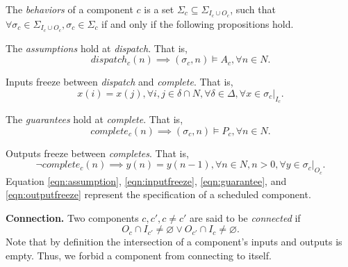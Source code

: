 

The \emph{behaviors} of a component $c$ is a set $\Sigma_c \subseteq \Sigma_{I_c \cup O_c}$, such that $\forall \sigma_c \in \Sigma_{I_c \cup O_c}, \sigma_c \in \Sigma_c $ if and only if the following propositions hold.

The \emph{assumptions} hold at \emph{dispatch}. That is,
\begin{equation} 
\label{eqn:assumption}
	dispatch_c(n) \implies (\sigma_c, n) \models A_c, \forall n\in N.
\end{equation}

Inputs freeze between \emph{dispatch} and \emph{complete}. That is,
\begin{equation} 
\label{eqn:inputfreeze}
	x(i) = x(j), \forall i,j\in \delta \cap N, \forall \delta \in \Delta, \forall x \in \sigma_c|_{I_c}.
\end{equation}

The \emph{guarantees} hold at \emph{complete}. That is,
\begin{equation} 
\label{eqn:guarantee}
	complete_c(n) \implies (\sigma_c, n) \models P_c, \forall n\in N.
\end{equation}

Outputs freeze between \emph{completes}. That is,
\begin{equation} 
\label{eqn:outputfreeze}
	\lnot complete_c(n) \implies y(n) = y(n-1), \forall n \in N, n > 0, \forall y \in \sigma_c|_{O_c}.
\end{equation}
Equation \ref{eqn:assumption}, \ref{eqn:inputfreeze}, \ref{eqn:guarantee}, and \ref{eqn:outputfreeze} represent the specification of a scheduled component.

{\bf Connection.}
Two components $ c, c', c\neq c'$ are said to be \emph{connected} if
\begin{equation*}
	O_c \cap I_{c'} \neq \varnothing \vee O_{c'} \cap I_c \neq \varnothing.
\end{equation*}
Note that by definition the intersection of a component's inputs and outputs is empty. Thus, we forbid a component from connecting to itself.

